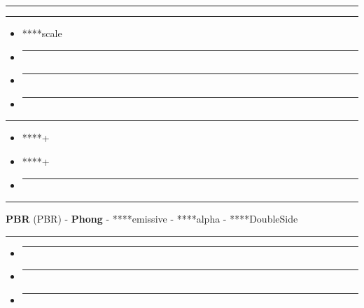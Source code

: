 \begin{center}\rule{0.5\linewidth}{0.5pt}\end{center}

\begin{center}\rule{0.5\linewidth}{0.5pt}\end{center}

\begin{itemize}
\item
  ****scale
\item
  \begin{center}\rule{0.5\linewidth}{0.5pt}\end{center}
\item
  \begin{center}\rule{0.5\linewidth}{0.5pt}\end{center}
\item
  \begin{center}\rule{0.5\linewidth}{0.5pt}\end{center}
\end{itemize}

\begin{center}\rule{0.5\linewidth}{0.5pt}\end{center}

\begin{itemize}
\item
  ****+
\item
  ****+
\item
  \begin{center}\rule{0.5\linewidth}{0.5pt}\end{center}
\end{itemize}

\begin{center}\rule{0.5\linewidth}{0.5pt}\end{center}

\textbf{PBR} (PBR) - \textbf{Phong} - ****emissive - ****alpha -
****DoubleSide

\begin{center}\rule{0.5\linewidth}{0.5pt}\end{center}

\begin{itemize}
\item
  \begin{center}\rule{0.5\linewidth}{0.5pt}\end{center}
\item
  \begin{center}\rule{0.5\linewidth}{0.5pt}\end{center}
\item
  \begin{center}\rule{0.5\linewidth}{0.5pt}\end{center}
\end{itemize}

